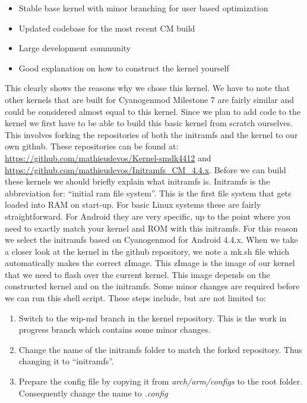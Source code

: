 \begin{itemize}
	\item Stable base kernel with minor branching for user based optimization
	\item Updated codebase for the most recent CM build
	\item Large development community
	\item Good explanation on how to construct the kernel yourself
\end{itemize}

This clearly shows the reasons why we chose this kernel. We have to note that other kernels that are built for Cyanogenmod Milestone 7 are fairly similar and could be considered almost equal to this kernel. Since we plan to add code to the kernel we first have to be able to build this basic kernel from scratch ourselves. This involves forking the repositories of both the initramfs and the kernel to our own github. These repositories can be found at: \url{https://github.com/mathieudevos/Kernel-smdk4412} and \url{https://github.com/mathieudevos/Initramfs_CM_4.4.x}. 
\npar
Before we can build these kernels we should briefly explain what initramfs is. Initramfs is the abbreviation for: ``initial ram file system''. This is the first file system that gets loaded into RAM on start-up. For basic Linux systems these are fairly straightforward. For Android they are very specific, up to the point where you need to exactly match your kernel and ROM with this initramfs. For this reason we select the initramfs based on Cyanogenmod for Android 4.4.x. When we take a closer look at the kernel in the github repository, we note a mk.sh file which automatically makes the correct zImage. This zImage is the image of our kernel that we need to flash over the current kernel. This image depends on the constructed kernel and on the initramfs. Some minor changes are required before we can run this shell script. These steps include, but are not limited to:

\begin{enumerate}
	\item Switch to the wip-md branch in the kernel repository. This is the work in progress branch which contains some minor changes.
	\item Change the name of the initramfs folder to match the forked repository. Thus changing it to ``initramfs''. 
	\item Prepare the config file by copying it from \emph{arch/arm/configs} to the root folder. Consequently change the name to \emph{.config}
\end{enumerate}

